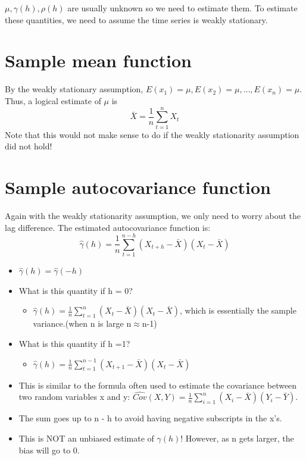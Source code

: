 \documentclass[
]{book}
\providecommand{\tightlist}{%
  \setlength{\itemsep}{0pt}\setlength{\parskip}{0pt}}
\theoremstyle{definition}
\theoremstyle{definition}
\theoremstyle{definition}
\theoremstyle{definition}
\theoremstyle{remark}
\begin{document}
\(\mu, \gamma(h),\rho(h)\) are usually unknown so we need to estimate them. To estimate these quantities, we need to assume the time series is weakly stationary.

\hypertarget{sample-mean-function}{%
\section{Sample mean function}\label{sample-mean-function}}

By the weakly stationary assumption, \(E(x_1) = \mu, E(x_2) = \mu,…, E(x_n) = \mu\). Thus, a logical estimate of \(\mu\) is\[\bar{X}=\frac{1}{n}\sum_{t=1}^{n}X_t\]
Note that this would not make sense to do if the weakly stationarity assumption did not hold!

\hypertarget{sample-autocovariance-function}{%
\section{Sample autocovariance function}\label{sample-autocovariance-function}}

Again with the weakly stationarity assumption, we only need to worry about the lag difference. The estimated autocovariance function is: \[\hat{\gamma}(h)=\frac{1}{n}\sum_{t=1}^{n-h}(X_{t+h}-\bar{X})(X_t-\bar{X})\]

\begin{itemize}
\tightlist
\item
  \(\hat{\gamma}(h)=\hat{\gamma}(-h)\)
\item
  What is this quantity if h = 0?

  \begin{itemize}
  \tightlist
  \item
    \(\hat{\gamma}(h)=\frac{1}{n}\sum_{t=1}^{n}(X_t-\bar{X})(X_t-\bar{X})\), which is essentially the sample variance.(when n is large n\(\approx\)n-1)
  \end{itemize}
\item
  What is this quantity if h =1?

  \begin{itemize}
  \tightlist
  \item
    \(\hat{\gamma}(h)=\frac{1}{n}\sum_{t=1}^{n-1}(X_{t+1}-\bar{X})(X_t-\bar{X})\)
  \end{itemize}
\item
  This is similar to the formula often used to estimate the covariance between two random variables x and y: \(\hat{Cov}(X,Y)=\frac{1}{n}\sum_{i=1}^{n}(X_i-\bar{X})(Y_i-\bar{Y})\).
\item
  The sum goes up to n - h to avoid having negative subscripts in the x's.
\item
  This is NOT an unbiased estimate of \(\gamma(h)\)! However, as n gets larger, the bias will go to 0.
\end{itemize}
\end{document}
